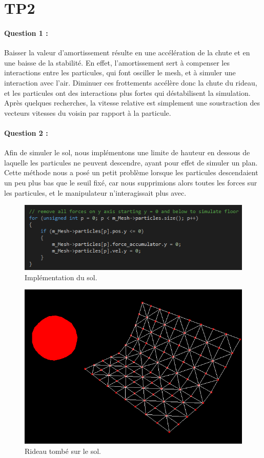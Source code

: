 \documentclass[a4paper,12pt]{article}
\begin{document}
\section{TP2}

\paragraph{Question 1 :} Baisser la valeur d'amortissement résulte en une accélération de la chute et en une baisse de la stabilité. En effet, l'amortissement sert à compenser les interactions entre les particules, qui font osciller le mesh, et à simuler une interaction avec l'air. Diminuer ces \og{}frottements\fg{} accélère donc la chute du rideau, et les particules ont des interactions plus fortes qui déstabilisent la simulation. Après quelques recherches, la vitesse relative est simplement une soustraction des vecteurs vitesses du voisin par rapport à la particule.

\paragraph{Question 2 :} Afin de simuler le sol, nous implémentons une limite de hauteur en dessous de laquelle les particules ne peuvent descendre, ayant pour effet de simuler un plan. Cette méthode nous a posé un petit problème lorsque les particules descendaient un peu plus bas que le seuil fixé, car nous supprimions alors toutes les forces sur les particules, et le manipulateur n’interagissait plus avec.
\begin{figure}
  \centering
  \includegraphics{images/sol_code.png}
  \caption{Implémentation du sol.}
  \label{fig:}
\end{figure}

\begin{figure}
  \centering
  \includegraphics{images/sol_image.png}
  \caption{Rideau tombé sur le sol.}
  \label{fig:}
\end{figure}
\end{document}
